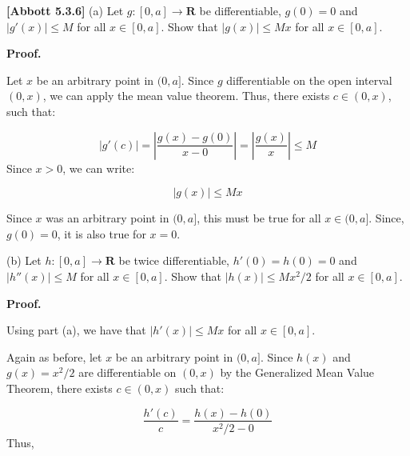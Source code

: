 \documentclass[10pt]{article}
\begin{document}
\textbf{[Abbott 5.3.6]} (a) Let $\displaystyle g:[ 0,a]\rightarrow \mathbf{R}$ be differentiable, $\displaystyle g( 0) =0$ and $\displaystyle |g'( x) |\leq M$ for all $\displaystyle x\in [ 0,a]$. Show that $\displaystyle |g( x) |\leq Mx$ for all $\displaystyle x\in [ 0,a]$. 



\textbf{Proof.}



Let $\displaystyle x$ be an arbitrary point in $\displaystyle ( 0,a]$. Since $\displaystyle g$ differentiable on the open interval $\displaystyle ( 0,x)$, we can apply the mean value theorem. Thus, there exists $\displaystyle c\in ( 0,x)$, such that:


\begin{equation*}
| g'( c)| =\left| \frac{g( x) -g( 0)}{x-0}\right| =\left| \frac{g( x)}{x}\right| \leq M
\end{equation*}
Since $\displaystyle x >0$, we can write:


\begin{equation*}
| g( x)| \leq Mx
\end{equation*}


Since $\displaystyle x$ was an arbitrary point in $\displaystyle ( 0,a]$, this must be true for all $\displaystyle x\in ( 0,a]$. Since, $\displaystyle g( 0) =0$, it is also true for $\displaystyle x=0$. 



(b) Let $\displaystyle h:[ 0,a]\rightarrow \mathbf{R}$ be twice differentiable, $\displaystyle h'( 0) =h( 0) =0$ and $\displaystyle | h''( x)| \leq M$ for all $\displaystyle x\in [ 0,a]$. Show that $\displaystyle | h( x)| \leq Mx^{2} /2$ for all $\displaystyle x\in [ 0,a]$.



\textbf{Proof.}



Using part (a), we have that $\displaystyle |h'( x) |\leq Mx$ for all $\displaystyle x\in [ 0,a]$.



Again as before, let $\displaystyle x$ be an arbitrary point in $\displaystyle ( 0,a]$. Since $\displaystyle h( x)$ and $\displaystyle g( x) =x^{2} /2$ are differentiable on $\displaystyle ( 0,x)$ by the Generalized Mean Value Theorem, there exists $\displaystyle c\in ( 0,x)$ such that:




\begin{equation*}
\frac{h'( c)}{c} =\frac{h( x) -h( 0)}{x^{2} /2-0}
\end{equation*}
Thus,
\end{document}
